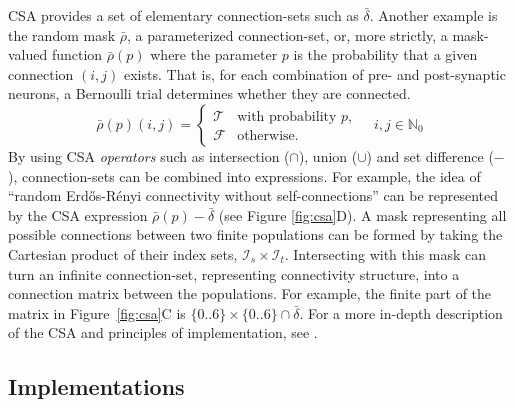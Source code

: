 \documentclass{frontiersSCNS} %
\newcommand{\Figure}[2]{Figure~\ref{#2}}
\newcommand{\Figure}[2]{Figure~#1}
\begin{document}
CSA provides a set of elementary connection-sets such as
$\bar{\delta}$. Another example is the random mask $\bar{\rho}$, a
parameterized connection-set, or, more strictly, a mask-valued
function $\bar{\rho}(p)$ where the parameter $p$ is the probability
that a given connection $(i, j)$ exists.  That is, for each
combination of pre- and post-synaptic neurons, a Bernoulli trial
determines whether they are connected.
\begin{equation}
  \bar{\rho} (p) (i, j) =
  \begin{cases}
    \mathcal{T}& \text{with probability $p$},\\
    \mathcal{F}& \text{otherwise}.
  \end{cases}
  \quad i, j \in \mathbb{N}_0
\end{equation}
By using CSA \emph{operators} such as intersection ($\cap$), union
($\cup$) and set difference ($-$), connection-sets can be combined into
expressions. For example, the idea of ``random Erd\H{o}s-R\'enyi
connectivity without self-connections'' can be represented by the CSA
expression $\bar{\rho}(p) - \bar{\delta}$ (see Figure
\ref{fig:csa}D). A mask representing all possible connections between
two finite populations can be formed by taking the Cartesian product
of their index sets, $\mathcal{I}_s \times
\mathcal{I}_t$. Intersecting with this mask can turn an infinite
connection-set, representing connectivity structure, into a connection
matrix between the populations. For example, the finite part of the
matrix in \Figure{1}{fig:csa}C is $\{0..6\} \times \{0..6\} \cap
\bar{\delta}$. For a more in-depth description of the CSA and
principles of implementation, see \citet{djurfeldt12}.

\subsection{Implementations}\label{sec:impl}
\end{document}
